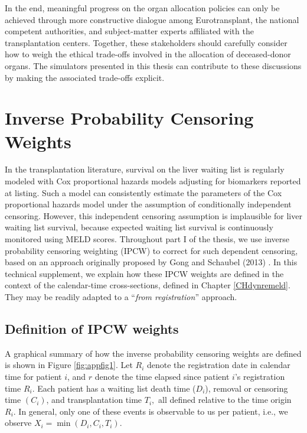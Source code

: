 \documentclass[11pt,twoside,]{book}
\begin{document}
In the end, meaningful progress on the organ allocation policies can only be
achieved through more constructive dialogue among Eurotransplant, the national
competent authorities, and subject-matter experts affiliated with the transplantation
centers. Together, these stakeholders should carefully consider how to weigh
the ethical trade-offs involved in the allocation of deceased-donor organs. The
simulators presented in this thesis can contribute to these discussions
by making the associated trade-offs explicit.

\appendix

\chapter{Inverse Probability Censoring Weights}\label{APPipcw}


In the transplantation literature, survival on the liver waiting list is regularly
modeled with Cox proportional hazards models adjusting for biomarkers reported at
listing. Such a model can consistently estimate the parameters of the Cox
proportional hazards model under the assumption of conditionally independent censoring.
However, this independent censoring assumption is implausible for liver waiting list
survival, because expected waiting list survival is continuously monitored using
MELD scores. Throughout part I of the thesis, we use
inverse probability censoring weighting (IPCW) to correct for such dependent censoring,
based on an approach originally proposed by Gong and Schaubel (2013)
\citep{gongPartlyConditionalEstimation2013}. In this technical supplement, we explain
how these IPCW weights are defined in the context of the calendar-time
cross-sections, defined in Chapter \ref{CHdynremeld}. They may be readily
adapted to a ``\emph{from registration}'' approach.

\section*{Definition of IPCW weights}\label{definition-of-ipcw-weights}

A graphical summary of how the inverse probability censoring weights are
defined is shown in Figure \ref{fig:appfig1}. Let \(R_{i}\) denote the registration date in calendar time for patient \(i\),
and \(r\) denote the time elapsed since patient \(i\)'s registration time \(R_{i}\).
Each patient has a waiting list death time (\(D_{i}\)), removal or censoring time
\(( C_{i} )\), and transplantation time \(T_{i},\) all defined
relative to the time origin \(R_{i}\). In general, only one of these events is
observable to us per patient, i.e., we observe \(X_{i} = \min( D_{i},C_{i},T_{i} )\).
\end{document}
